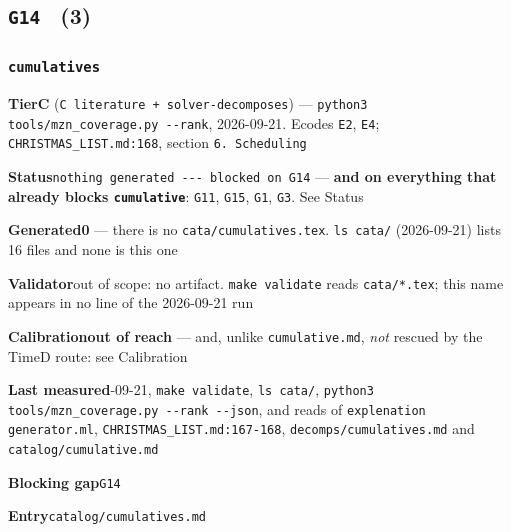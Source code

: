 \documentclass[10pt,a4paper]{article}
\newcommand{\entryfield}[2]{{\raggedright\textbf{#1}\quad #2\par}}
\begin{document}
\subsection*{\texttt{G14} \ \normalsize(3)}
\subsubsection*{\texttt{cumulatives}}
\label{entry:cumulatives}
\entryfield{Tier}{\textbf{C} (\texttt{C literature + solver-\allowbreak{}decomposes}) --- \texttt{python3 tools/\allowbreak{}mzn\_\allowbreak{}coverage.\allowbreak{}py -\allowbreak{}-\allowbreak{}rank}, 2026-09-21. Ecodes \texttt{E2}, \texttt{E4}; \texttt{CHRISTMAS\_LIST.md:168}, section \texttt{6. Scheduling}}
\entryfield{Status}{\texttt{nothing generated -\allowbreak{}-\allowbreak{}-\allowbreak{} blocked on G14} --- \textbf{and on everything that already blocks \texttt{cumulative}}: \texttt{G11}, \texttt{G15}, \texttt{G1}, \texttt{G3}. See Status}
\entryfield{Generated}{\textbf{0} --- there is no \texttt{cata/cumulatives.tex}. \texttt{ls cata/} (2026-09-21) lists 16 files and none is this one}
\entryfield{Validator}{out of scope: no artifact. \texttt{make validate} reads \texttt{cata/*.tex}; this name appears in no line of the 2026-09-21 run}
\entryfield{Calibration}{\textbf{out of reach} --- and, unlike \texttt{cumulative.md}, \emph{not} rescued by the TimeD route: see Calibration}
\entryfield{Last measured}{2026-09-21, \texttt{make validate}, \texttt{ls cata/}, \texttt{python3 tools/\allowbreak{}mzn\_\allowbreak{}coverage.\allowbreak{}py -\allowbreak{}-\allowbreak{}rank -\allowbreak{}-\allowbreak{}json}, and reads of \texttt{explenation generator.ml}, \texttt{CHRISTMAS\_\allowbreak{}LIST.\allowbreak{}md:167-\allowbreak{}168}, \texttt{decomps/cumulatives.md} and \texttt{catalog/cumulative.md}}
\entryfield{Blocking gap}{\texttt{G14}}
\entryfield{Entry}{\texttt{catalog/cumulatives.md}}
\end{document}
